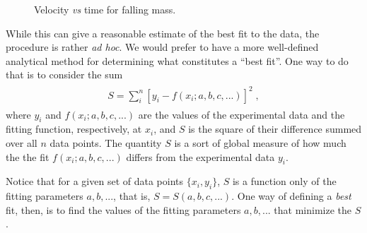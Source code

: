 \documentclass[letterpaper,10pt,english]{sphinxmanual}
\begin{document}
\begin{figure}[htbp]
\centering
\capstart

\caption{Velocity \emph{vs} time for falling mass.}\label{chap7/chap7_funcs:fig-fallingmassdataplot}\end{figure}

While this can give a reasonable estimate of the best fit to the data, the procedure is rather \emph{ad hoc}.  We would prefer to have a more well-defined analytical method for determining what constitutes a ``best fit''.  One way to do that is to consider the sum
\label{chap7/chap7_funcs:equation-eq:lsqrsum}\begin{gather}
\begin{split}S = \sum_{i}^{n} [y_{i} - f(x_{i}; a, b, c, ...)]^2 \;,\end{split}\label{chap7/chap7_funcs-eq:lsqrsum}
\end{gather}
where $y_{i}$ and $f(x_{i}; a, b, c, ...)$ are the values of the experimental data and the fitting function, respectively, at $x_{i}$, and $S$ is the square of their difference summed over all $n$ data points.  The quantity $S$ is a sort of global measure of how much the the fit $f(x_{i}; a, b, c, ...)$ differs from the experimental data $y_{i}$.

Notice that for a given set of data points $\{x_i, y_i\}$, $S$ is a function only of the fitting parameters $a, b, ...$, that is, $S=S(a, b, c, ...)$.  One way of defining a \emph{best} fit, then, is to find the values of the fitting parameters $a, b, ...$ that minimize the $S$.
\end{document}
